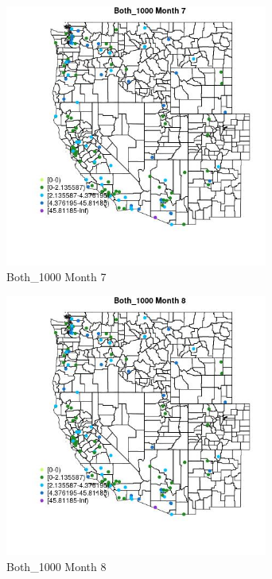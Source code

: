 \begin{figure} 
\centering  
\includegraphics[width=0.77\textwidth]{Code_Outputs/Report_ML_input_PM25_Step4_part_e_de_duplicated_aves_MapObsMo7Both_1000.jpg} 
\caption{\label{fig:Report_ML_input_PM25_Step4_part_e_de_duplicated_avesMapObsMo7Both_1000}Both_1000 Month 7} 
\end{figure} 
 

\begin{figure} 
\centering  
\includegraphics[width=0.77\textwidth]{Code_Outputs/Report_ML_input_PM25_Step4_part_e_de_duplicated_aves_MapObsMo8Both_1000.jpg} 
\caption{\label{fig:Report_ML_input_PM25_Step4_part_e_de_duplicated_avesMapObsMo8Both_1000}Both_1000 Month 8} 
\end{figure} 
 

